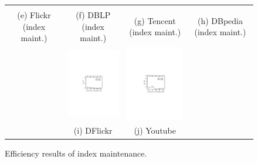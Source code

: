 \begin{figure}[htp]
\begin{tabular}{c c c c}
\begin{minipage}{3.76cm}
  \end{minipage}
  \\
  \small (e) Flickr (index maint.)
  &
  \small (f) DBLP (index maint.)
  &
  \small (g) Tencent (index maint.)
  &
  \small (h) DBpedia (index  maint.)
  \\
  &
 \begin{minipage}{3.325cm}
  \includegraphics[width=3.725cm]{figures/DynamicFlickr}
  \end{minipage}
  &
  \begin{minipage}{3.325cm}
  \includegraphics[width=3.725cm]{figures/DynamicYoutube}
  \end{minipage}
  \\
  &
  \small (i) DFlickr
  &
  \small (j) Youtube
  &
\\
\end{tabular}
\caption{Efficiency results of index maintenance.}
\label{fig:exp-indexMaintenance}
\end{figure}


